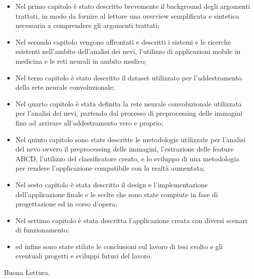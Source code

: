 \begin{itemize}
\item Nel primo capitolo è stato descritto brevemente il background degli argomenti trattati, in modo da fornire al lettore una overview semplificata e sintetica necessaria a comprendere gli argomenti trattati;
\item Nel secondo capitolo vengono affrontati e descritti i sistemi e le ricerche esistenti nell'ambito dell'analisi dei nevi, l'utilizzo di applicazioni mobile in medicina e le reti neurali in ambito medico;
\item Nel terzo capitolo è stato descritto il dataset utilizzato per l'addestramento della rete neurale convoluzionale;
\item Nel quarto capitolo è stata definita la rete neurale convoluzionale utilizzata per l'analisi dei nevi, partendo dal processo di preprocessing delle immagini fino ad arrivare all'addestramento vero e proprio;
\item Nel quinto capitolo sono state descritte le metodologie utilizzate per l'analisi del nevo ovvero il preprocessing delle immagini, l'estrazione delle feature ABCD, l'utilizzo del classificatore creato, e lo sviluppo di una metodologia per rendere l'applicazione compatibile con la realtà aumentata;
\item Nel sesto capitolo è stata descritto il design e l'implementazione dell'applicazione finale e le scelte che sono state compiute in fase di progettazione ed in corso d'opera;
\item Nel settimo capitolo è stata descritta l'applicazione creata con diversi scenari di funzionamento;
\item ed infine sono state stilate le conclusioni sul lavoro di tesi svolto e gli eventuali progetti e sviluppi futuri del lavoro. 
\end{itemize}
Buona Lettura.